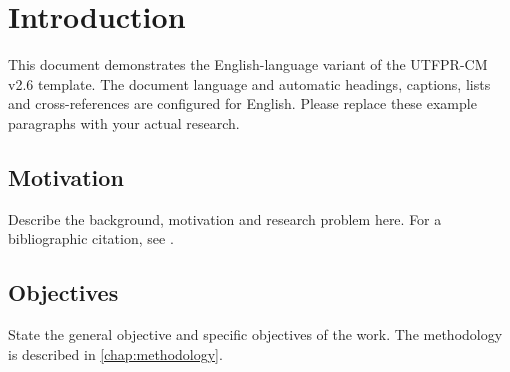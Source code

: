 \chapter{Introduction}\label{chap:introduction}
This document demonstrates the English-language variant of the UTFPR-CM v2.6 template. The document language and automatic headings, captions, lists and cross-references are configured for English. Please replace these example paragraphs with your actual research.

\section{Motivation}
Describe the background, motivation and research problem here. For a bibliographic citation, see \cite{Coulouris2013}.

\section{Objectives}
State the general objective and specific objectives of the work. The methodology is described in \autoref{chap:methodology}.
